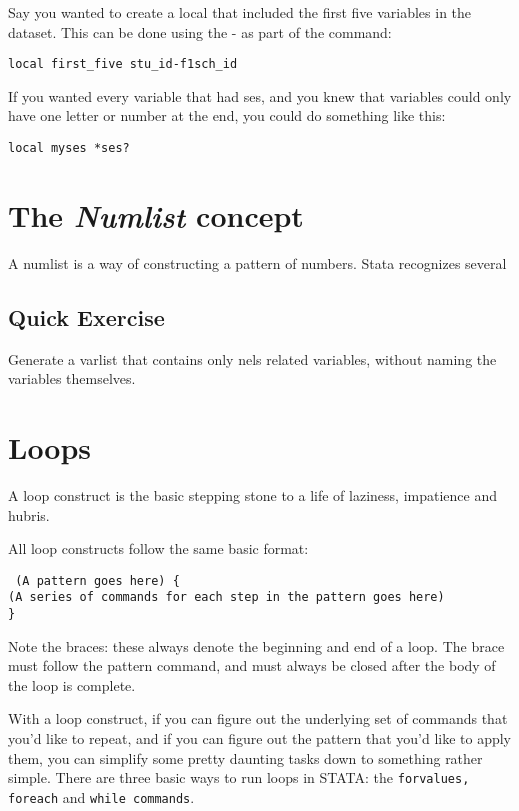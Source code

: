 \documentclass[10pt]{article}
\begin{document}
Say you wanted to create a local that included the first five
variables in the dataset. This can be done using the - as part of the
command:

\texttt{local first\_five stu\_id-f1sch\_id}

If you wanted every variable that had ses, and you knew that variables
could only have one letter or number at the end, you could do
something like this:

\texttt{local myses *ses?}

\section{The \textit{Numlist} concept}
\label{sec:text-conc}

A numlist is a way of constructing a pattern of numbers. Stata
recognizes several 

\subsection{Quick Exercise}

Generate a varlist that contains only nels related variables, without
naming the variables themselves. 
 

\section{Loops}
\label{sec:loops}

A loop construct is the basic stepping stone to a life of laziness,
impatience and hubris. 

All loop constructs follow the same basic format: 

\texttt{ (A pattern goes here) \{\\
(A series of commands for each step in the pattern goes here) \\
\} \\}

Note the braces: these always denote the beginning and end of a
loop. The brace must follow the pattern command, and must always be
closed after the body of the loop is complete. 

With a loop construct, if you can figure out the underlying set of
commands that you'd like to repeat, and if you can figure out the
pattern that you'd like to apply them, you can simplify some pretty
daunting tasks down to something rather simple. There are three basic
ways to run loops in STATA: the \texttt{forvalues, foreach} and
\texttt{while commands}.
\end{document}

